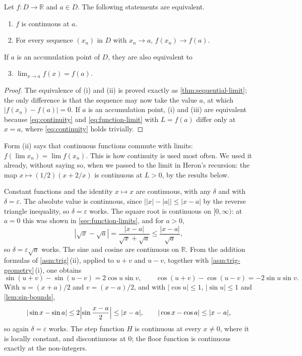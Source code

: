 \begin{theorem}
\label{thm:continuity-forms}
Let $f\colon D\to\mathbb R$ and $a\in D$. The following statements are equivalent.
\begin{enumerate}
\item $f$ is continuous at $a$.
\item For every sequence $(x_n)$ in $D$ with $x_n\to a$, $f(x_n)\to f(a)$.
\end{enumerate}
If $a$ is an accumulation point of $D$, they are also equivalent to
\begin{enumerate}
\setcounter{enumi}{2}
\item $\lim_{x\to a}f(x)=f(a)$.
\end{enumerate}
\end{theorem}

\begin{proof}
The equivalence of (i) and (ii) is proved exactly as \cref{thm:sequential-limit}; the only difference is that the sequence may now take the value $a$, at which $|f(x_n)-f(a)|=0$. If $a$ is an accumulation point, (i) and (iii) are equivalent because \eqref{eq:continuity} and \eqref{eq:function-limit} with $L=f(a)$ differ only at $x=a$, where \eqref{eq:continuity} holds trivially.
\end{proof}

Form (ii) says that continuous functions commute with limits: $f(\lim x_n)=\lim f(x_n)$. This is how continuity is used most often. We used it already, without saying so, when we passed to the limit in Heron's recursion: the map $x\mapsto(1/2)(x+2/x)$ is continuous at $L>0$, by the results below.

Constant functions and the identity $x\mapsto x$ are continuous, with any $\delta$ and with $\delta=\varepsilon$. The absolute value is continuous, since $\bigl||x|-|a|\bigr|\le|x-a|$ by the reverse triangle inequality, so $\delta=\varepsilon$ works. The square root is continuous on $[0,\infty)$: at $a=0$ this was shown in \cref{sec:function-limits}, and for $a>0$,
\[
|\sqrt x-\sqrt a|=\frac{|x-a|}{\sqrt x+\sqrt a}\le\frac{|x-a|}{\sqrt a},
\]
so $\delta=\varepsilon\sqrt a$ works. The sine and cosine are continuous on $\mathbb R$. From the addition formulas of \cref{asm:trig}\,(ii), applied to $u+v$ and $u-v$, together with \cref{asm:trig-geometry}\,(i), one obtains
\[
\sin(u+v)-\sin(u-v)=2\cos u\sin v,\qquad\cos(u+v)-\cos(u-v)=-2\sin u\sin v .
\]
With $u=(x+a)/2$ and $v=(x-a)/2$, and with $|\cos u|\le1$, $|\sin u|\le1$ and \cref{lem:sin-bounds},
\begin{equation}
|\sin x-\sin a|\le2\Bigl|\sin\frac{x-a}2\Bigr|\le|x-a|,\qquad|\cos x-\cos a|\le|x-a| ,
\label{eq:sin-lipschitz}
\end{equation}
so again $\delta=\varepsilon$ works. The step function $H$ is continuous at every $x\ne0$, where it is locally constant, and discontinuous at $0$; the floor function is continuous exactly at the non-integers.

